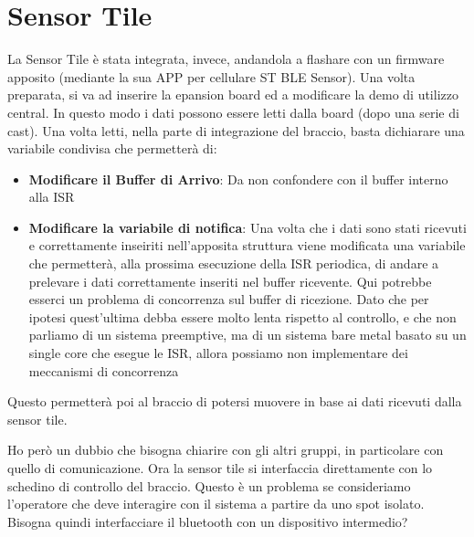 \section{Sensor Tile}
La Sensor Tile è stata integrata, invece, andandola a flashare con un firmware apposito (mediante la sua APP per cellulare ST BLE Sensor). Una volta preparata, si va ad inserire la epansion board ed a modificare la demo di utilizzo central. In questo modo i dati possono essere letti dalla board (dopo una serie di cast). Una volta letti, nella parte di integrazione del braccio, basta dichiarare una variabile condivisa che permetterà di:
\begin{itemize}
    \item \textbf{Modificare il Buffer di Arrivo}: Da non confondere con il buffer interno alla ISR
    \item \textbf{Modificare la variabile di notifica}: Una volta che i dati sono stati ricevuti e correttamente inseiriti nell'apposita struttura viene modificata una variabile che permetterà, alla prossima esecuzione della ISR periodica, di andare a prelevare i dati correttamente inseriti nel buffer ricevente. Qui potrebbe esserci un problema di concorrenza sul buffer di ricezione. Dato che per ipotesi quest'ultima debba essere molto lenta rispetto al controllo, e che non parliamo di un sistema preemptive, ma di un sistema bare metal basato su un single core che esegue le ISR, allora possiamo non implementare dei meccanismi di concorrenza
\end{itemize}

Questo permetterà poi al braccio di potersi muovere in base ai dati ricevuti dalla sensor tile.

Ho però un dubbio che bisogna chiarire con gli altri gruppi, in particolare con quello di comunicazione. Ora la sensor tile si interfaccia direttamente con lo schedino di controllo del braccio. Questo è un problema se consideriamo l'operatore che deve interagire con il sistema a partire da uno spot isolato. Bisogna quindi interfacciare il bluetooth con un dispositivo intermedio?